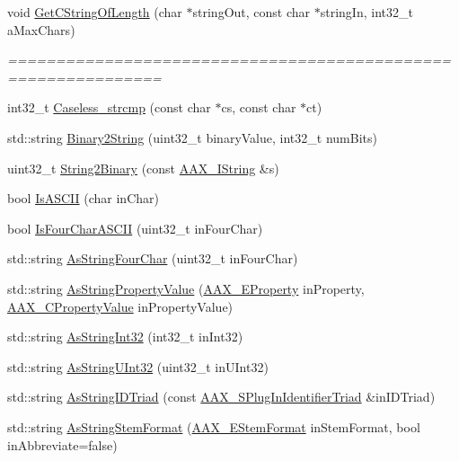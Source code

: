 \begin{DoxyCompactItemize}
\item 
void \mbox{\hyperlink{a00852_aa3db8a743884054a6ac1ec2c2495e86f}{Get\+C\+String\+Of\+Length}} (char $\ast$string\+Out, const char $\ast$string\+In, int32\+\_\+t a\+Max\+Chars)
\begin{DoxyCompactList}\small\item\em ============================================================== \end{DoxyCompactList}\item 
int32\+\_\+t \mbox{\hyperlink{a00852_a5f092aff54cbd222fda57f5ea0a12189}{Caseless\+\_\+strcmp}} (const char $\ast$cs, const char $\ast$ct)
\item 
std\+::string \mbox{\hyperlink{a00852_a690ffc499da04ea963fff3bf8d6174fb}{Binary2\+String}} (uint32\+\_\+t binary\+Value, int32\+\_\+t num\+Bits)
\item 
uint32\+\_\+t \mbox{\hyperlink{a00852_a7b02e5d4a96f72213f0d1e4b52e13050}{String2\+Binary}} (const \mbox{\hyperlink{a01873}{A\+A\+X\+\_\+\+I\+String}} \&s)
\item 
bool \mbox{\hyperlink{a00852_aa8ebc6a8ee1232c4ffec828bff3c2998}{Is\+A\+S\+C\+II}} (char in\+Char)
\item 
bool \mbox{\hyperlink{a00852_a00fbf59b268ca75214b2dad68be8ff77}{Is\+Four\+Char\+A\+S\+C\+II}} (uint32\+\_\+t in\+Four\+Char)
\item 
std\+::string \mbox{\hyperlink{a00852_a22eda3cc42cb4ea2192b00bab7a69b02}{As\+String\+Four\+Char}} (uint32\+\_\+t in\+Four\+Char)
\item 
std\+::string \mbox{\hyperlink{a00852_a1b3d4b5a967f01922963876447644b15}{As\+String\+Property\+Value}} (\mbox{\hyperlink{a00662_a13e384f22825afd3db6d68395b79ce0d}{A\+A\+X\+\_\+\+E\+Property}} in\+Property, \mbox{\hyperlink{a00392_ab247c0d8686c14e05cbb567ef276f249}{A\+A\+X\+\_\+\+C\+Property\+Value}} in\+Property\+Value)
\item 
std\+::string \mbox{\hyperlink{a00852_ab024a3d9ac9c68350b377b2c70ec4727}{As\+String\+Int32}} (int32\+\_\+t in\+Int32)
\item 
std\+::string \mbox{\hyperlink{a00852_ada4fd7cb0e04582a7615a76f6be7e404}{As\+String\+U\+Int32}} (uint32\+\_\+t in\+U\+Int32)
\item 
std\+::string \mbox{\hyperlink{a00852_a89e00fcb44e30c443bebba0f026ef62a}{As\+String\+I\+D\+Triad}} (const \mbox{\hyperlink{a01425}{A\+A\+X\+\_\+\+S\+Plug\+In\+Identifier\+Triad}} \&in\+I\+D\+Triad)
\item 
std\+::string \mbox{\hyperlink{a00852_a34d219233eb5c9836b837fa2a67150d1}{As\+String\+Stem\+Format}} (\mbox{\hyperlink{a00491_ad8af5ef008b2bd478add9a0acb0a1d85}{A\+A\+X\+\_\+\+E\+Stem\+Format}} in\+Stem\+Format, bool in\+Abbreviate=false)

\end{DoxyCompactItemize}
